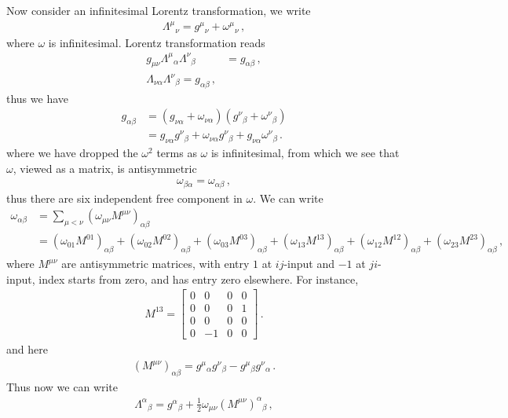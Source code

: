 \documentclass[11pt, onesided]{book}
\theoremstyle{break}
\theoremstyle{break}
\newcommand{\bmat}[1]{\begin{bmatrix} #1 \end{bmatrix}}
\begin{document}
Now consider an infinitesimal Lorentz transformation, we write
\begin{align*}
\Lambda^\mu{}_\nu = g^\mu{}_\nu + \omega^\mu{}_\nu\,,
\end{align*}
where $\omega$ is infinitesimal. Lorentz transformation reads
\begin{align*}
g_{\mu\nu}\Lambda^\mu{}_\alpha \Lambda^\nu{}_\beta &= g_{\alpha\beta}\,,\\
\Lambda_{\nu\alpha} \Lambda^\nu{}_\beta  = g_{\alpha\beta}\,,
\end{align*}
thus we have
\begin{align*}
g_{\alpha\beta} 
&= (g_{\nu{\alpha}}+ \omega_{\nu \alpha}) (g^\nu{}_\beta + \omega^\nu{}_\beta) \\
&= g_{\nu\alpha}g^\nu{}_\beta + \omega_{\nu \alpha} g^\nu{}_\beta  + g_{\nu \alpha}\omega^\nu{}_\beta \,.
\end{align*}
where we have dropped the $\omega^2$ terms as $\omega $ is infinitesimal, from which we see that $\omega$, viewed as a matrix, is antisymmetric
\begin{align*}
\omega_{\beta\alpha} = \omega_{\alpha \beta}\,,
\end{align*}
thus there are six independent free component in $\omega$. We can write
\begin{align*}
\omega_{\alpha\beta}
&= \sum_{\mu<\nu} \left( \omega_{\mu\nu} M^{\mu\nu}\right)_{\alpha\beta}\\ 
&= \left( \omega_{01} M^{01}\right)_{\alpha\beta} +\left( \omega_{02}M^{02} \right)_{\alpha\beta} + \left( \omega_{03}M^{03} \right)_{\alpha\beta}
+
 \left(\omega_{13} M^{13}\right)_{\alpha\beta} +\left( \omega_{12}M^{12} \right)_{\alpha\beta} + \left( \omega_{23}M^{23} \right)_{\alpha\beta}\,,
\end{align*}
where $M^{\mu\nu}$ are antisymmetric matrices, with entry $1$ at $ij$-input and $-1$ at $ji$-input, index starts from zero, and has entry zero elsewhere. For instance,
\begin{align*}
M^{13} = \bmat{
0 & 0 & 0& 0\\
0 & 0 & 0& 1\\
0 & 0& 0 & 0\\
0 & -1 & 0 & 0
}\,.
\end{align*}
and here
\begin{align*}
(M^{\mu\nu})_{\alpha\beta} = g^\mu{}_\alpha g^\nu{}_\beta - g^{\mu}{}_\beta g^\nu{}_\alpha\,.
\end{align*}
Thus now we can write
\begin{align*}
\Lambda^\alpha{}_\beta = g^\alpha{}_\beta + \frac{1}{2}\omega_{\mu\nu}(M^{\mu\nu})^\alpha{}_{\beta}\,,
\end{align*}
\end{document}
